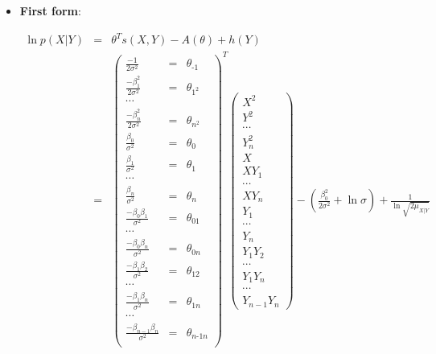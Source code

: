\documentclass[11pt, oneside]{article}   	%
\numberwithin{figure}{section}
\numberwithin{equation}{section}
\numberwithin{table}{section}
\begin{document}
\begin{itemize}
\item \textbf{First form}:

\begin{eqnarray*}
\ln p(X|Y) &=& \theta^T s(X,Y) - A(\theta) + h(Y)\\
&=&
\begin{pmatrix}
\frac{-1}{2\sigma^2} &=& \theta_{\mbox{-}1} \\
\frac{-\beta_1^2}{2\sigma^2} &=& \theta_{1^2} \\
\cdots \\
\frac{-\beta_n^2}{2\sigma^2} &=& \theta_{n^2} \\
\frac{\beta_0}{\sigma^2} &=& \theta_0 \\
\frac{\beta_1}{\sigma^2} &=& \theta_1 \\
\cdots\\
\frac{\beta_n}{\sigma^2} &=& \theta_n \\
\frac{-\beta_0\beta_1}{\sigma^2} &=&\theta_{01} \\
\cdots\\
\frac{-\beta_0\beta_n}{\sigma^2} &=& \theta_{0n} \\
\frac{-\beta_1\beta_2}{\sigma^2} &=& \theta_{12} \\
\cdots\\
\frac{-\beta_1\beta_n}{\sigma^2} &=& \theta_{1n} \\
\cdots\\
\frac{-\beta_{n-1}\beta_n}{\sigma^2} &=&\theta_{n\mbox{-}1n} \\
\end{pmatrix}^T
\begin{pmatrix}
X^2\\
Y^2\\
\cdots\\
Y_n^2\\
X\\
XY_1\\
\cdots\\
XY_n\\
Y_1\\
\cdots\\
Y_n\\
Y_1Y_2\\
\cdots\\
Y_1Y_n\\
\cdots\\
Y_{n-1}Y_n
\end{pmatrix}
- \left( \frac{\beta_0^2}{2\sigma^2} + \ln{\sigma}\right) + \frac{1}{\ln{\sqrt{2\mu_{X|Y}}}}
\end{eqnarray*}


\end{itemize}
\end{document}
